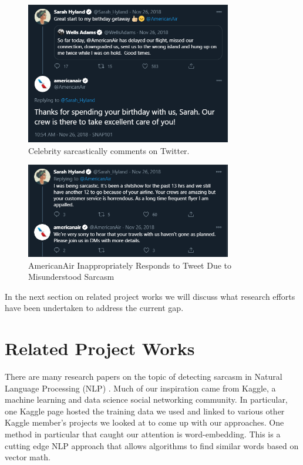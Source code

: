 \documentclass[conference]{IEEEtran}
\begin{document}
\begin{figure}[htbp]
\centerline{\includegraphics[width=9cm]{image6.png}}
\caption{Celebrity sarcastically comments on Twitter.}
\label{fig4}
\end{figure}


\begin{figure}[htbp]
\centerline{\includegraphics[width=9cm]{image7.png}}
\caption{AmericanAir Inappropriately Responds to Tweet Due to Misunderstood Sarcasm}
\label{fig5}
\end{figure}

In the next section on related project works we will discuss what research efforts have been undertaken to address the current gap.\\

\section{Related Project Works}
There are many research papers on the topic of detecting sarcasm in Natural Language Processing (NLP) \cite{b3} \cite{b4}. Much of our inspiration came from Kaggle, a machine learning and data science social networking community. In particular, one Kaggle page \cite{b1} hosted the training data we used and linked to various other Kaggle member’s projects we looked at to come up with our approaches. One method in particular that caught our attention is word-embedding. This is a cutting edge NLP approach that allows algorithms to find similar words based on vector math. \\
\end{document}
